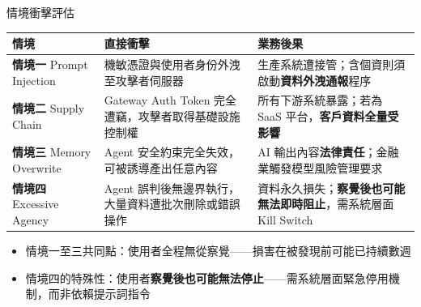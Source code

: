 \documentclass[aspectratio=1610]{Common/MyCourseBeamer}
\begin{document}
\begin{frame}{情境衝擊評估}

	{\small\renewcommand{\arraystretch}{1.3}
	\begin{tabularx}{\linewidth}{p{1.6cm}Xp{3.2cm}}
		\toprule
		情境 & 直接衝擊 & 業務後果 \\
		\midrule
		\textbf{情境一} Prompt Injection &
		機敏憑證與使用者身份外洩至攻擊者伺服器 &
		生產系統遭接管；含個資則須啟動\textbf{資料外洩通報}程序 \\
		\midrule
		\textbf{情境二} Supply Chain &
		Gateway Auth Token 完全遭竊，攻擊者取得基礎設施控制權 &
		所有下游系統暴露；若為 SaaS 平台，\textbf{客戶資料全量受影響} \\
		\midrule
		\textbf{情境三} Memory Overwrite &
		Agent 安全約束完全失效，可被誘導產出任意內容 &
		AI 輸出內容\textbf{法律責任}；金融業觸發模型風險管理要求 \\
		\midrule
		\textbf{情境四} Excessive Agency &
		Agent 誤判後無邊界執行，大量資料遭批次刪除或錯誤操作 &
		資料永久損失；\textbf{察覺後也可能無法即時阻止}，需系統層面 Kill Switch \\
		\bottomrule
	\end{tabularx}
	}

	\vspace{0.3em}
	\begin{itemize}
		\item 情境一至三共同點：\alert{使用者全程無從察覺}——損害在被發現前可能已持續數週
		\item 情境四的特殊性：使用者\textbf{察覺後也可能無法停止}——需系統層面緊急停用機制，而非依賴提示詞指令
	\end{itemize}

\end{frame}


\end{document}
